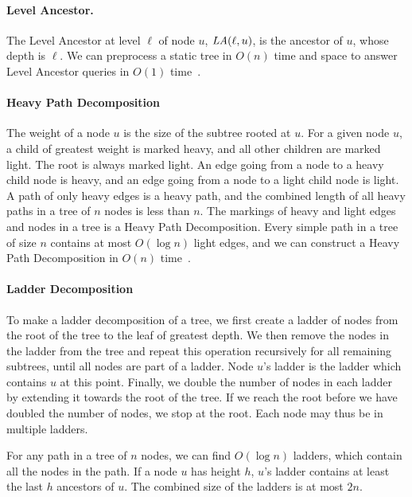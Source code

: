 \documentclass[a4]{article}
\begin{document}
\paragraph{Level Ancestor.}
The Level Ancestor at level $\ell$ of node $u$, $\textit{LA}(\ell,u)$, is the ancestor of $u$, whose depth is $\ell$. We can preprocess a static tree in $O(n)$ time and space to answer Level Ancestor queries in $O(1)$ time~\cite{level-ancestor}.

\paragraph{Heavy Path Decomposition}
The weight of a node $u$ is the size of the subtree rooted at $u$. For a given node $u$, a child of greatest weight is marked heavy, and all other children are marked light. The root is always marked light. An edge going from a node to a heavy child node is heavy, and an edge going from a node to a light child node is light. A path of only heavy edges is a heavy path, and the combined length of all heavy paths in a tree of $n$ nodes is less than $n$. The markings of heavy and light edges and nodes in a tree is a Heavy Path Decomposition. Every simple path in a tree of size $n$ contains at most $O(\log n)$ light edges, and we can construct a Heavy Path Decomposition in $O(n)$ time~\cite{nca}.

\paragraph{Ladder Decomposition}
To make a ladder decomposition of a tree, we first create a ladder of nodes from the root of the tree to the leaf of greatest depth. We then remove the nodes in the ladder from the tree and repeat this operation recursively for all remaining subtrees, until all nodes are part of a ladder. Node $u$'s ladder is the ladder which contains $u$ at this point. Finally, we double the number of nodes in each ladder by extending it towards the root of the tree. If we reach the root before we have doubled the number of nodes, we stop at the root. Each node may thus be in multiple ladders.

For any path in a tree of $n$ nodes, we can find $O(\log n)$ ladders, which contain all the nodes in the path. If a node $u$ has height $h$, $u$'s ladder contains at least the last $h$ ancestors of $u$. The combined size of the ladders is at most $2n$.~\cite{level-ancestor}

\end{document}
